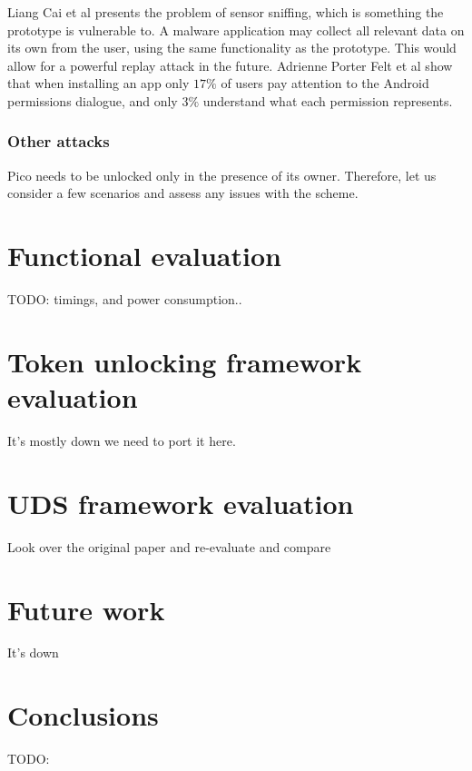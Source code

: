 Liang Cai et al \cite{cai2009defending} presents the problem of sensor sniffing, which is something the prototype is vulnerable to. A malware application may collect all relevant data on its own from the user, using the same functionality as the prototype. This would allow for a powerful replay attack in the future. Adrienne Porter Felt et al \cite{felt2012android} show that when installing an app only $17\%$ of users pay attention to the Android permissions dialogue, and only $3\%$ understand what each permission represents.

\subsubsection*{Other attacks}
Pico needs to be unlocked only in the presence of its owner. Therefore, let us consider a few scenarios and assess any issues with the scheme.

\section{Functional evaluation}
TODO: timings, and power consumption..

\section{Token unlocking framework evaluation}
It's mostly down we need to port it here.

\section{UDS framework evaluation}
Look over the original paper and re-evaluate and compare

\section{Future work}
It's down

\section{Conclusions}
TODO:


